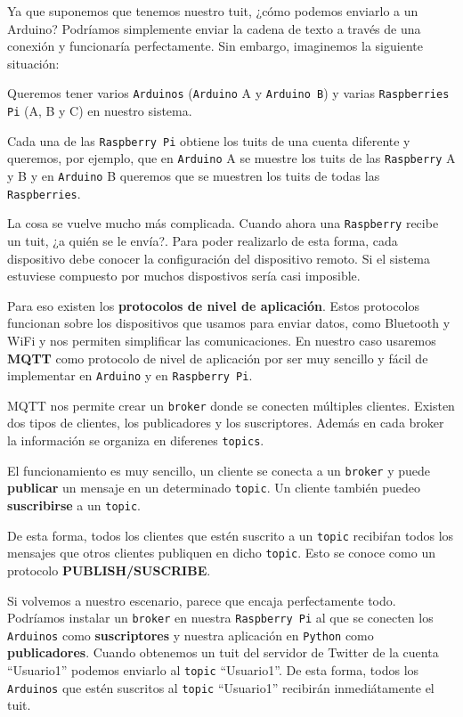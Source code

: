Ya que suponemos que tenemos nuestro tuit, ¿cómo podemos enviarlo a un Arduino?
Podríamos simplemente enviar la cadena de texto a través de una conexión y
funcionaría perfectamente. Sin embargo, imaginemos la siguiente situación:

Queremos tener varios \texttt{Arduinos} (\texttt{Arduino} A y \texttt{Arduino B}) y varias
\texttt{Raspberries Pi} (A, B y C) en nuestro sistema.

Cada una de las \texttt{Raspberry Pi} obtiene los tuits de una cuenta diferente
y queremos, por ejemplo, que en \texttt{Arduino} A se muestre los tuits de las
\texttt{Raspberry} A y B y en \texttt{Arduino} B queremos que se muestren los
tuits de todas las \texttt{Raspberries}.

La cosa se vuelve mucho más complicada. Cuando ahora una \texttt{Raspberry} recibe
un tuit, ¿a quién se le envía?. Para poder realizarlo de esta forma, cada dispositivo
debe conocer la configuración del dispositivo remoto. Si el sistema estuviese
compuesto por muchos dispostivos sería casi imposible.

Para eso existen los \textbf{protocolos de nivel de aplicación}. Estos protocolos
funcionan sobre los dispositivos que usamos para enviar datos, como Bluetooth y
WiFi y nos permiten simplificar las comunicaciones. En nuestro caso usaremos
\textbf{MQTT} como protocolo de nivel de aplicación por ser muy sencillo y fácil
de implementar en \texttt{Arduino} y en \texttt{Raspberry Pi}.

MQTT nos permite crear un \texttt{broker} donde se
conecten múltiples clientes. Existen dos tipos de clientes, los publicadores y
los suscriptores. Además en cada broker la información se organiza en diferenes
\texttt{topics}.

El funcionamiento es muy sencillo, un cliente se conecta a un \texttt{broker} y
puede \textbf{publicar} un mensaje en un determinado \texttt{topic}. Un cliente
también puedeo \textbf{suscribirse} a un \texttt{topic}.

De esta forma, todos los clientes que estén suscrito a un \texttt{topic} recibiŕan
todos los mensajes que otros clientes publiquen en dicho \texttt{topic}. Esto se
conoce como un protocolo \textbf{PUBLISH/SUSCRIBE}.

Si volvemos a nuestro escenario, parece que encaja perfectamente todo. Podríamos
instalar un \texttt{broker} en nuestra \texttt{Raspberry Pi} al que se conecten
los \texttt{Arduinos} como \textbf{suscriptores} y nuestra aplicación en
\texttt{Python} como \textbf{publicadores}. Cuando obtenemos un tuit del
servidor de Twitter de la cuenta ``Usuario1'' podemos enviarlo al \texttt{topic}
``Usuario1''. De esta forma, todos los \texttt{Arduinos} que estén suscritos
al \texttt{topic} ``Usuario1'' recibirán inmediátamente el tuit.


